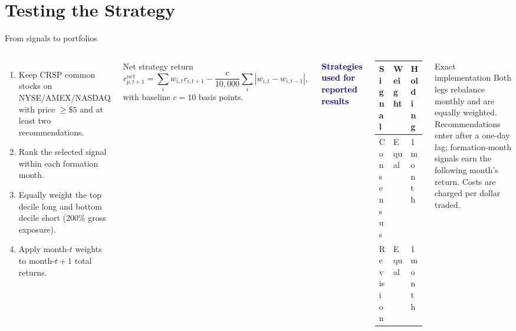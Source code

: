 \documentclass[aspectratio=169,10pt]{beamer}
\newcommand{\smallhead}[1]{\textcolor{navy}{\textbf{#1}}}
\begin{document}
\section{Testing the Strategy}
\begin{frame}[shrink=10]{From signals to portfolios}
\begin{columns}[T,onlytextwidth]
\begin{enumerate}\setlength\itemsep{0.42em}
  \item Keep CRSP common stocks on NYSE/AMEX/NASDAQ with price $\geq\$5$ and at least two recommendations.
  \item Rank the selected signal within each formation month.
  \item Equally weight the top decile long and bottom decile short (200\% gross exposure).
  \item Apply month-$t$ weights to month-$t+1$ total returns.
\end{enumerate}
\begin{block}{Net strategy return}
\[
r^{net}_{p,t+1}=\sum_i w_{i,t}r_{i,t+1}
-\frac{c}{10{,}000}\sum_i|w_{i,t}-w_{i,t-1}|,
\]
with baseline $c=10$ basis points.
\end{block}
\smallhead{Strategies used for reported results}
\begin{center}\small
\begin{tabular}{@{}lll@{}}
\toprule
Signal & Weight & Holding \\
\midrule
Consensus & Equal & 1 month \\
Revision & Equal & 1 month \\
\bottomrule
\end{tabular}
\end{center}
\vspace{0.25cm}
\begin{block}{Exact implementation}
Both legs rebalance monthly and are equally weighted. Recommendations enter after a one-day lag; formation-month signals earn the following month's return. Costs are charged per dollar traded.
\end{block}
\end{columns}
\end{frame}
\end{document}
